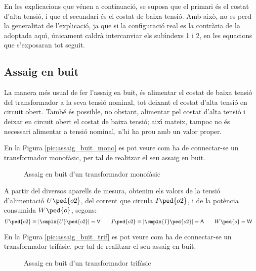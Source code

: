 En les explicacions que v\'{e}nen a continuaci\'{o}, se suposa que el
primari \'{e}s el costat d'alta tensi\'{o}, i que el secundari \'{e}s el costat
de baixa tensi\'{o}. Amb aix\`{o}, no es perd la generalitat de
l'explicaci\'{o}, ja que si la configuraci\'{o} real es la contr\`{a}ria de la
adoptada aqu\'{\i}, \'{u}nicament caldr\`{a} intercanviar els sub\'{\i}ndexs 1 i 2, en
les equacions que s'exposaran tot seguit.

\subsection{Assaig en buit}

La manera m\'{e}s usual de fer l'assaig en buit, \'{e}s alimentar el costat
de baixa tensi\'{o} del transformador a  la seva tensi\'{o} nominal, tot
deixant el costat d'alta tensi\'{o} en circuit obert. Tamb\'{e} \'{e}s possible,
no obstant, alimentar pel costat d'alta tensi\'{o} i deixar en circuit
obert el costat de baixa tensi\'{o}; aix\'{\i} mateix, tampoc no \'{e}s necessari
alimentar a tensi\'{o} nominal, n'hi ha prou amb un valor proper.

En la Figura \vref{pic:assaig_buit_mono} es pot veure com ha de
connectar-se un transformador monof\`{a}sic, per tal de realitzar el seu
assaig en buit.

\begin{figure}[htb]
\centering
    
\caption{Assaig en buit d'un transformador monof\`{a}sic}
\label{pic:assaig_buit_mono}
\end{figure}

A partir del diversos aparells de mesura, obtenim els valors de la
tensi\'{o} d'alimentaci\'{o} $U\ped{o2}$, del corrent que circula
$I\ped{o2}$, i de la pot\`{e}ncia consumida $W\ped{o}$, segons:
\begin{equation}
    U\ped{o2}\equiv|\cmplx{U}\ped{o2}|=\textsf{V} \qquad
    I\ped{o2}\equiv|\cmplx{I}\ped{o2}|=\textsf{A}
    \qquad W\ped{o}=\textsf{W}
\end{equation}

En la Figura \vref{pic:assaig_buit_trif} es pot veure com ha de
connectar-se un transformador trif\`{a}sic, per tal de realitzar el seu
assaig en buit.

\begin{figure}[htb]
\centering
    
\caption{Assaig en buit d'un transformador trif\`{a}sic}
\label{pic:assaig_buit_trif}
\end{figure}


